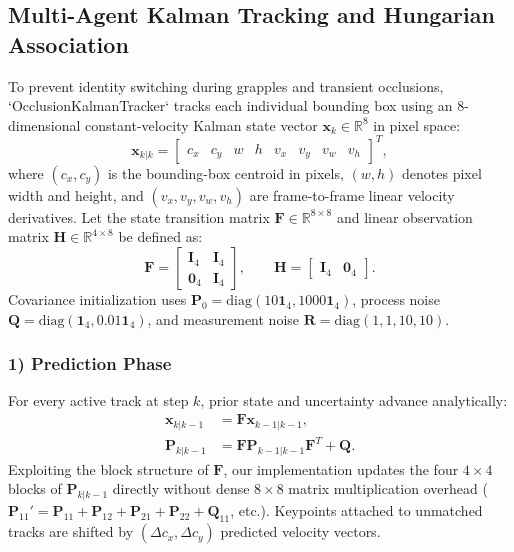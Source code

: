 \documentclass[conference]{IEEEtran}
\begin{document}
\subsection{Multi-Agent Kalman Tracking and Hungarian Association}
To prevent identity switching during grapples and transient occlusions, `OcclusionKalmanTracker` tracks each individual bounding box using an 8-dimensional constant-velocity Kalman state vector $\mathbf{x}_k \in \mathbb{R}^8$ in pixel space:
\begin{equation}
\mathbf{x}_{k|k} = \begin{bmatrix} c_x & c_y & w & h & v_x & v_y & v_w & v_h \end{bmatrix}^T,
\end{equation}
where $(c_x, c_y)$ is the bounding-box centroid in pixels, $(w, h)$ denotes pixel width and height, and $(v_x, v_y, v_w, v_h)$ are frame-to-frame linear velocity derivatives. Let the state transition matrix $\mathbf{F} \in \mathbb{R}^{8 \times 8}$ and linear observation matrix $\mathbf{H} \in \mathbb{R}^{4 \times 8}$ be defined as:
\begin{equation}
\mathbf{F} = \begin{bmatrix} \mathbf{I}_4 & \mathbf{I}_4 \\ \mathbf{0}_4 & \mathbf{I}_4 \end{bmatrix}, \qquad
\mathbf{H} = \begin{bmatrix} \mathbf{I}_4 & \mathbf{0}_4 \end{bmatrix}.
\end{equation}
Covariance initialization uses $\mathbf{P}_0 = \text{diag}(10\mathbf{1}_4, 1000\mathbf{1}_4)$, process noise $\mathbf{Q} = \text{diag}(\mathbf{1}_4, 0.01\mathbf{1}_4)$, and measurement noise $\mathbf{R} = \text{diag}(1, 1, 10, 10)$.

\subsubsection*{1) Prediction Phase}
For every active track at step $k$, prior state and uncertainty advance analytically:
\begin{align}
\mathbf{x}_{k|k-1} &= \mathbf{F}\mathbf{x}_{k-1|k-1}, \\
\mathbf{P}_{k|k-1} &= \mathbf{F}\mathbf{P}_{k-1|k-1}\mathbf{F}^T + \mathbf{Q}.
\end{align}
Exploiting the block structure of $\mathbf{F}$, our implementation updates the four $4 \times 4$ blocks of $\mathbf{P}_{k|k-1}$ directly without dense $8 \times 8$ matrix multiplication overhead ($\mathbf{P}_{11}' = \mathbf{P}_{11} + \mathbf{P}_{12} + \mathbf{P}_{21} + \mathbf{P}_{22} + \mathbf{Q}_{11}$, etc.). Keypoints attached to unmatched tracks are shifted by $(\Delta c_x, \Delta c_y)$ predicted velocity vectors.
\end{document}
